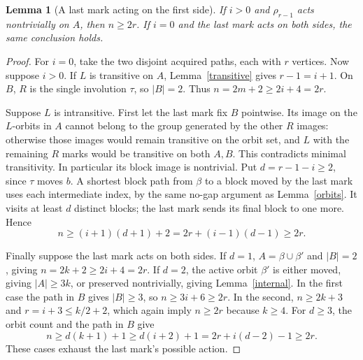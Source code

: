 \documentclass[11pt,a4paper]{article}
\newtheorem{lemma}{Lemma}
\begin{document}
\begin{lemma}[A last mark acting on the first side]\label{last}
If $i>0$ and $\rho_{r-1}$ acts nontrivially on $A$, then
$n\ge2r$. If $i=0$ and the last mark acts on both sides,
the same conclusion holds.
\end{lemma}
\begin{proof}
For $i=0$, take the two disjoint acquired paths, each with
$r$ vertices. Now suppose $i>0$. If $L$ is transitive on
$A$, Lemma~\ref{transitive} gives $r-1=i+1$. On $B$, $R$
is the single involution $\tau$, so $|B|=2$. Thus
$n=2m+2\ge2i+4=2r$.

Suppose $L$ is intransitive. First let the last mark fix
$B$ pointwise. Its image on the $L$-orbits in $A$ cannot
belong to the group generated by the other $R$ images:
otherwise those images would remain transitive on the orbit
set, and $L$ with the remaining $R$ marks would be transitive
on both $A,B$. This contradicts minimal transitivity.
In particular its block image is nontrivial. Put
$d=r-1-i\ge2$, since $\tau$ moves $b$. A shortest block
path from $\beta$ to a block moved by the last mark uses
each intermediate index, by the same no-gap argument as
Lemma~\ref{orbits}. It visits at least $d$ distinct blocks;
the last mark sends its final block to one more. Hence
\[
 n\ge(i+1)(d+1)+2=2r+(i-1)(d-1)\ge2r.
\]

Finally suppose the last mark acts on both sides. If $d=1$,
$A=\beta\cup\beta'$ and $|B|=2$, giving
$n=2k+2\ge2i+4=2r$. If $d=2$, the active orbit $\beta'$
is either moved, giving $|A|\ge3k$, or preserved nontrivially,
giving Lemma~\ref{internal}. In the first case the path in
$B$ gives $|B|\ge3$, so $n\ge3i+6\ge2r$. In the second,
$n\ge2k+3$ and $r=i+3\le k/2+2$, which again imply
$n\ge2r$ because $k\ge4$. For $d\ge3$, the orbit count
and the path in $B$ give
\[
 n\ge d(k+1)+1\ge d(i+2)+1
                =2r+i(d-2)-1\ge2r.
\]
These cases exhaust the last mark's possible action.
\end{proof}
\end{document}
